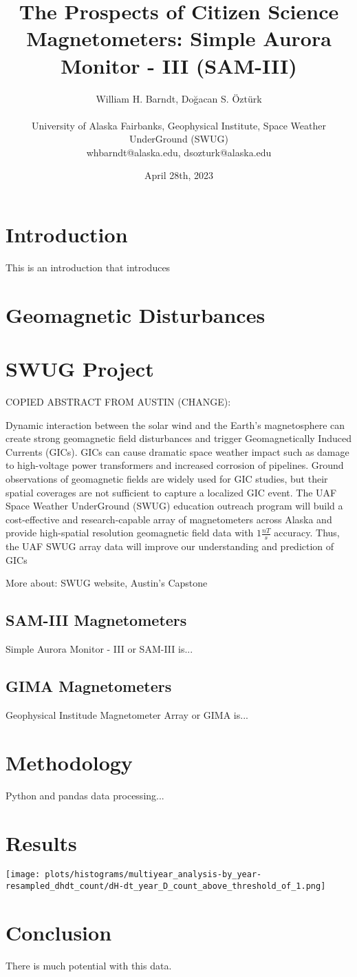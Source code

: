 \documentclass[12pt]{article}
\title{The Prospects of Citizen Science Magnetometers: Simple Aurora Monitor - III (SAM-III)}
\author
{William H. Barndt, Doğacan S. Öztürk\\
\\
\normalsize{University of Alaska Fairbanks, Geophysical Institute, Space Weather UnderGround (SWUG)}\\
\normalsize{whbarndt@alaska.edu, dsozturk@alaska.edu}
}
\date{April 28th, 2023}
\newenvironment{sciabstract}{%
\begin{quote} \bf}
{\end{quote}}
\begin{document}
 
\maketitle
\begin{sciabstract}
    
\end{sciabstract}

\section*{Introduction}
This is an introduction that introduces

\section*{Geomagnetic Disturbances}

\section*{SWUG Project}
COPIED ABSTRACT FROM AUSTIN (CHANGE):
\par
Dynamic interaction between the solar wind and the Earth's magnetosphere can create strong geomagnetic field disturbances and trigger Geomagnetically Induced Currents (GICs). GICs can cause dramatic space weather impact such as damage to high-voltage power transformers and increased corrosion of pipelines. Ground observations of geomagnetic fields are widely used for GIC studies, but their spatial coverages are not sufficient to capture a localized GIC event.
The UAF Space Weather UnderGround (SWUG) education outreach program will build a cost-effective and research-capable array of magnetometers across Alaska and provide high-spatial resolution geomagnetic field data with $1 \frac{nT}{s}$ accuracy. Thus, the UAF SWUG array data will improve our understanding and prediction of GICs
\par
More about: SWUG website, Austin's Capstone

\subsection*{SAM-III Magnetometers}
Simple Aurora Monitor - III or SAM-III is...

\subsection*{GIMA Magnetometers}
Geophysical Institude Magnetometer Array or GIMA is...

\section*{Methodology}
Python and pandas data processing... 

\section*{Results}
\texttt{[image: plots/histograms/multiyear\_analysis-by\_year-resampled\_dhdt\_count/dH-dt\_year\_D\_count\_above\_threshold\_of\_1.png]}

\section*{Conclusion}
There is much potential with this data.
\end{document}
